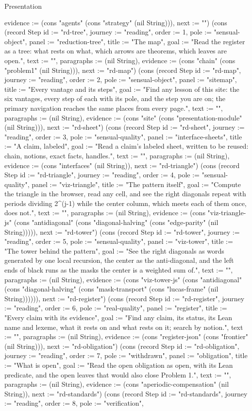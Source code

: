 \begin{lexlean}{Presentation}
\begin{semanticmodule}
{evidence := (cons "agents" (cons "strategy" (nil String))), next := ""}) (cons (record Step {id := "rd-tree", journey := "reading", order := 1, pole := "sensual-object", panel := "reduction-tree", title := "The map", goal := "Read the register as a tree: what rests on what, which arrows are theorems, which leaves are open.", text := "", paragraphs := (nil String), evidence := (cons "chain" (cons "problem1" (nil String))), next := "rd-map"}) (cons (record Step {id := "rd-map", journey := "reading", order := 2, pole := "sensual-object", panel := "sitemap", title := "Every vantage and its steps", goal := "Find any lesson of this site: the six vantages, every step of each with its pole, and the step you are on; the primary navigation reaches the same places from every page.", text := "", paragraphs := (nil String), evidence := (cons "site" (cons "presentation-module" (nil String))), next := "rd-sheet"}) (cons (record Step {id := "rd-sheet", journey := "reading", order := 3, pole := "sensual-quality", panel := "interface-sheets", title := "A claim, labeled", goal := "Read a claim's labeled sheet, written to be reused: chain, notions, exact facts, handles.", text := "", paragraphs := (nil String), evidence := (cons "interfaces" (nil String)), next := "rd-triangle"}) (cons (record Step {id := "rd-triangle", journey := "reading", order := 4, pole := "sensual-quality", panel := "viz-triangle", title := "The pattern itself", goal := "Compute the triangle in the browser, read any cell, and see the right diagonals repeat with periods dividing 2^(j-1) while the center column, which meets each of them once, does not.", text := "", paragraphs := (nil String), evidence := (cons "viz-triangle-js" (cons "antidiagonal" (cons "diagonal-halving" (cons "edge-parity" (nil String))))), next := "rd-tower"}) (cons (record Step {id := "rd-tower", journey := "reading", order := 5, pole := "sensual-quality", panel := "viz-tower", title := "The tower behind the pattern", goal := "See the right diagonals as words generated by one local recursion, the center as the anti-diagonal, and the left ends of black runs as the masks the center is a weighted sum of.", text := "", paragraphs := (nil String), evidence := (cons "viz-tower-js" (cons "antidiagonal" (cons "diagonal-halving" (cons "mask-transport" (cons "lucas-frame" (nil String)))))), next := "rd-register"}) (cons (record Step {id := "rd-register", journey := "reading", order := 6, pole := "real-quality", panel := "register", title := "Every claim with its evidence", goal := "Find any claim, its status, its Lean name and lexeme, what it rests on and what rests on it; search by notion.", text := "", paragraphs := (nil String), evidence := (cons "register-json" (cons "frontier" (nil String))), next := "rd-obligation"}) (cons (record Step {id := "rd-obligation", journey := "reading", order := 7, pole := "withdrawn", panel := "obligation", title := "What is open", goal := "Read the open obligation as open, with its Lean predicate, and the open leaves that would also close Problem 1.", text := "", paragraphs := (nil String), evidence := (cons "aperiodic-compensation" (nil String)), next := "rd-standards"}) (cons (record Step {id := "rd-standards", journey := "reading", order := 8, pole := "verification", }
\end{semanticmodule}
\end{lexlean}
